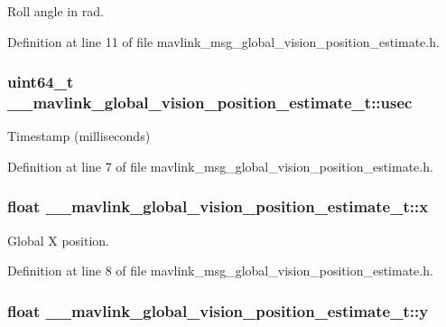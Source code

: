 Roll angle in rad. 



Definition at line 11 of file mavlink\-\_\-msg\-\_\-global\-\_\-vision\-\_\-position\-\_\-estimate.\-h.

\hypertarget{struct____mavlink__global__vision__position__estimate__t_acf639462e3875daf642a84fc1a1a829b}{
\subsubsection[{usec}]{\setlength{\rightskip}{0pt plus 5cm}uint64\-\_\-t \-\_\-\-\_\-mavlink\-\_\-global\-\_\-vision\-\_\-position\-\_\-estimate\-\_\-t\-::usec}}\label{struct____mavlink__global__vision__position__estimate__t_acf639462e3875daf642a84fc1a1a829b}


Timestamp (milliseconds) 



Definition at line 7 of file mavlink\-\_\-msg\-\_\-global\-\_\-vision\-\_\-position\-\_\-estimate.\-h.

\hypertarget{struct____mavlink__global__vision__position__estimate__t_a88cd56fff31fdbd1490526e27e56811a}{
\subsubsection[{x}]{\setlength{\rightskip}{0pt plus 5cm}float \-\_\-\-\_\-mavlink\-\_\-global\-\_\-vision\-\_\-position\-\_\-estimate\-\_\-t\-::x}}\label{struct____mavlink__global__vision__position__estimate__t_a88cd56fff31fdbd1490526e27e56811a}


Global X position. 



Definition at line 8 of file mavlink\-\_\-msg\-\_\-global\-\_\-vision\-\_\-position\-\_\-estimate.\-h.

\hypertarget{struct____mavlink__global__vision__position__estimate__t_a8d9936412bbccb077e7cd7c608ff4293}{
\subsubsection[{y}]{\setlength{\rightskip}{0pt plus 5cm}float \-\_\-\-\_\-mavlink\-\_\-global\-\_\-vision\-\_\-position\-\_\-estimate\-\_\-t\-::y}}\label{struct____mavlink__global__vision__position__estimate__t_a8d9936412bbccb077e7cd7c608ff4293}


